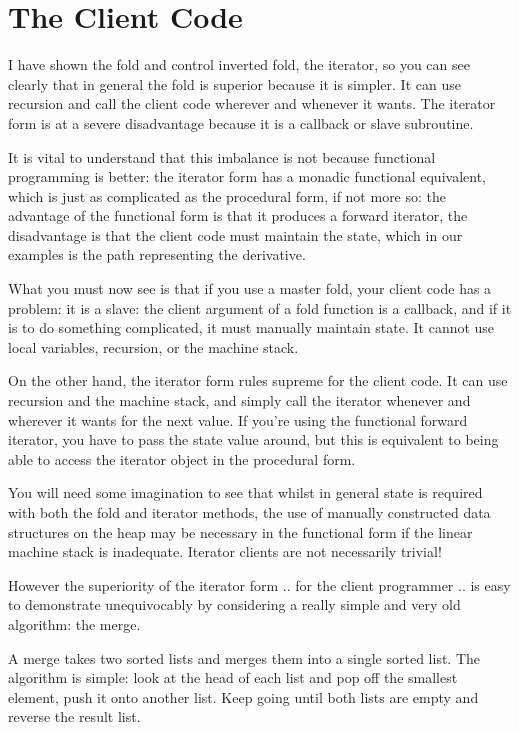 \documentclass[oneside]{book}
\begin{document}
\section{The Client Code}
I have shown the fold and control inverted fold, the iterator,
so you can see clearly that in general the fold is superior because
it is simpler. It can use recursion and call the client code wherever
and whenever it wants. The iterator form is at a severe disadvantage
because it is a callback or slave subroutine.

It is vital to understand that this imbalance is not because functional
programming is better: the iterator form has a monadic functional
equivalent, which is just as complicated as the procedural form,
if not more so: the advantage of the functional form is that it 
produces a forward iterator, the disadvantage is that the client
code must maintain the state, which in our examples is the path
representing the derivative.

What you must now see is that if you use a master fold, your client
code has a problem: it is a slave: the client argument of a fold
function is a callback, and if it is to do something complicated,
it must manually maintain state. It cannot use local variables,
recursion, or the machine stack.

On the other hand, the iterator form rules supreme for the client
code. It can use recursion and the machine stack, and simply call
the iterator whenever and wherever it wants for the next value.
If you're using the functional forward iterator, you have to pass
the state value around, but this is equivalent to being able
to access the iterator object in the procedural form.

You will need some imagination to see that whilst in general
state is required with both the fold and iterator methods,
the use of manually constructed data structures on the heap
may be necessary in the functional form 
if the linear machine stack is inadequate. Iterator clients
are not necessarily trivial!

However the superiority of the iterator form .. for the client
programmer .. is easy to demonstrate unequivocably by considering
a really simple and very old algorithm: the merge.

A merge takes two sorted lists and merges them into a single
sorted list. The algorithm is simple: look at the head of each
list and pop off the smallest element, push it onto another list.
Keep going until both lists are empty and reverse the result list.
\end{document}
